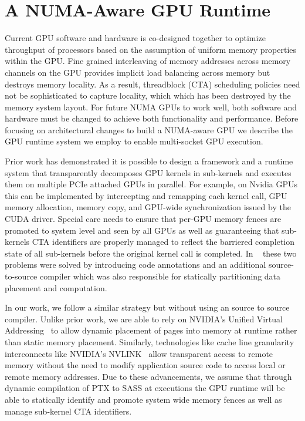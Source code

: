 \section{A NUMA-Aware GPU Runtime}

Current GPU software and hardware is co-designed together to optimize 
throughput of processors based on the assumption of uniform memory properties 
within the GPU. Fine grained interleaving of memory addresses across memory 
channels on the GPU provides implicit load balancing across memory but destroys 
memory locality.  As a result, threadblock (CTA) scheduling policies need not 
be sophisticated to capture locality, which which has been destroyed by the 
memory system layout.  For future NUMA GPUs to work well, both software and 
hardware must be changed to achieve both functionality and performance.  Before 
focusing on architectural changes to build a NUMA-aware GPU we describe the GPU 
runtime system we employ to enable multi-socket GPU execution.

Prior work has demonstrated it is possible to design a framework and a runtime 
system that transparently decomposes GPU kernels in sub-kernels and executes 
them on multiple PCIe attached GPUs in parallel. For example, on Nvidia GPUs 
this can be implemented by intercepting and remapping each kernel call, GPU 
memory allocation, memory copy, and GPU-wide synchronization issued by the CUDA 
driver. Special care needs to ensure that per-GPU memory fences are promoted to 
system level and seen by all GPUs as well as guaranteeing that sub-kernels CTA 
identifiers are properly managed to reflect the barriered completion state of 
all sub-kernels before the original kernel call is completed. In 
~\cite{Cabezas2015} these two problems were solved by introducing  code 
annotations and an additional source-to-source compiler which was also 
responsible for statically partitioning data placement and computation.

In our work, we follow a similar strategy but without using an source to source
compiler. Unlike prior work, we are able to rely on NVIDIA's Unified Virtual 
Addressing~\cite{UVM} to allow dynamic placement of pages into memory at
runtime rather than static memory placement.  Similarly, technologies like
cache line granularity interconnects like NVIDIA's NVLINK~\cite{NVLINK} allow
transparent access to remote memory without the need to modify application
source code to access local or remote memory addresses.  Due to these
advancements, we assume that through dynamic compilation of PTX to SASS at
executions the GPU runtime will be able to statically identify and promote 
system wide memory fences as well as manage sub-kernel CTA identifiers.

